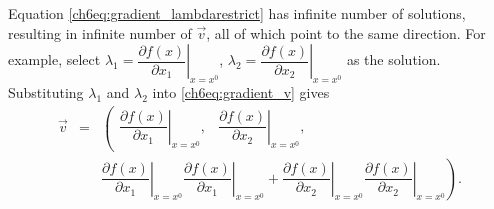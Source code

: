 Equation \eqref{ch6eq:gradient_lambdarestrict} has infinite number of solutions, resulting in infinite number of $\vec{v}$, all of which point to the same direction. For example, select $\lambda_1 = \left.\dfrac{\partial f(x)}{\partial x_1}\right|_{x=x^0}$, $\lambda_2 = \left.\dfrac{\partial f(x)}{\partial x_2}\right|_{x=x^0}$ as the solution. Substituting $\lambda_1$ and $\lambda_2$ into \eqref{ch6eq:gradient_v} gives
\begin{eqnarray}
  \vec{v} &=& \left(\begin{array}{cc}
              \left.\dfrac{\partial f(x)}{\partial x_1}\right|_{x=x^0}, & \left.\dfrac{\partial f(x)}{\partial x_2}\right|_{x=x^0},
            \end{array} \right. \nonumber \\
            && \left. \left.\dfrac{\partial f(x)}{\partial x_1}\right|_{x=x^0} \left.\dfrac{\partial f(x)}{\partial x_1}\right|_{x=x^0} + \left.\dfrac{\partial f(x)}{\partial x_2}\right|_{x=x^0} \left.\dfrac{\partial f(x)}{\partial x_2}\right|_{x=x^0} \right). \label{ch6eq:gradient_finalv}
\end{eqnarray}

